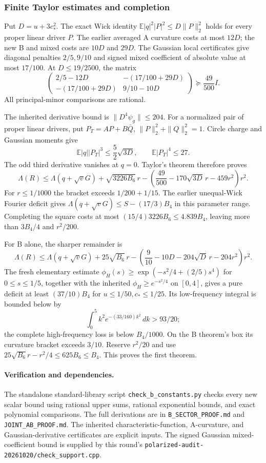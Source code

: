 \subsubsection{Finite Taylor estimates and completion}
Put $D=u+3c_*^2$. The exact Wick identity
$\mathbb E|q|^2|P|^2\le D\|P\|_2^2$ holds for every proper linear
driver $P$. The earlier averaged A curvature costs at most $12D$;
the new B and mixed costs are $10D$ and $29D$.
The Gaussian local certificates give diagonal penalties $2/5,9/10$
and signed mixed coefficient of absolute value at most $17/100$.
At $D\le19/2500$, the matrix
\[
 \begin{pmatrix}2/5-12D&-(17/100+29D)\\
 -(17/100+29D)&9/10-10D\end{pmatrix}
 \succeq\frac{49}{500}I.
\]
All principal-minor comparisons are rational.

The inherited derivative bound is $\|D^4\psi_g\|\le204$.
For a normalized pair of proper linear drivers, put
$P_T=AP+B\bar Q$, $\|P\|_2^2+\|Q\|_2^2=1$.
Circle charge and Gaussian moments give
\[
 \mathbb E|q||P_T|^3\le\frac52\sqrt{3D},\qquad
 \mathbb E|P_T|^4\le27.
\]
The odd third derivative vanishes at $q=0$. Taylor's theorem therefore
proves
\[
 \Lambda(R)\le\Lambda(q+\sqrt vG)+\sqrt{3226B_6}\,r
 -\left(\frac{49}{500}-170\sqrt{3D}\,r-459r^2\right)r^2.
\]
For $r\le1/1000$ the bracket exceeds $1/200+1/15$.
The earlier unequal-Wick Fourier deficit gives
$\Lambda(q+\sqrt vG)\le S-(17/3)B_4$ in this parameter range.
Completing the square costs at most
$(15/4)3226B_6\le4.839B_4$, leaving more than $3B_4/4$ and $r^2/200$.

For B alone, the sharper remainder is
\[
 \Lambda(R)\le\Lambda(q+\sqrt vG)+25\sqrt{B_6}\,r
 -\left(\frac9{10}-10D-204\sqrt D\,r-204r^2\right)r^2.
\]
The fresh elementary estimate
$\phi_H(s)\ge\exp(-s^2/4+(2/5)s^4)$ for $0\le s\le1/5$,
together with the inherited $\phi_H\ge e^{-s^2/4}$ on $[0,4]$,
gives a pure deficit at least $(37/10)B_4$ for $u\le1/50,c_*\le1/25$.
Its low-frequency integral is bounded below by
\[
 \int_0^5 k^2e^{-(33/160)k^2}\,dk>93/20;
\]
the complete high-frequency loss is below $B_4/1000$.
On the B theorem's box its curvature bracket exceeds $3/10$.
Reserve $r^2/20$ and use
$25\sqrt{B_6}r-r^2/4\le625B_6\le B_4$.
This proves the first theorem.

\paragraph{Verification and dependencies.}
The standalone standard-library script \texttt{check\_b\_constants.py}
checks every new scalar bound using rational upper sums, rational
exponential bounds, and exact polynomial comparisons. The full
derivations are in \texttt{B\_SECTOR\_PROOF.md} and
\texttt{JOINT\_AB\_PROOF.md}. The inherited characteristic-function,
A-curvature, and Gaussian-derivative certificates are explicit inputs.
The signed Gaussian mixed-coefficient bound is supplied by this round's
\texttt{polarized-audit-20261020/check\_support.cpp}.

